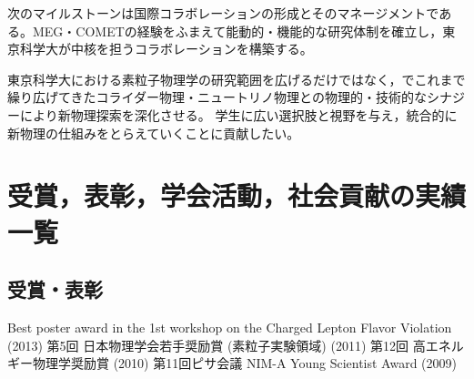 \documentclass[11pt,a4paper,uplatex,dvipdfmx]{ujarticle} 		%
\newcommand{\研究課題名}{象の卵}
\newcommand{\研究機関名}{東京大学}
\newcommand{\研究代表者氏名}{内山雄祐}
\newcommand{\研究期間の最終元号年度}{6}  %
\begin{document}
次のマイルストーンは国際コラボレーションの形成とそのマネージメントである。MEG・COMETの経験をふまえて能動的・機能的な研究体制を確立し，東京科学大が中核を担うコラボレーションを構築する。
%
%
%

\vspace{1zw}
東京科学大における素粒子物理学の研究範囲を広げるだけではなく，でこれまで繰り広げてきたコライダー物理・ニュートリノ物理との物理的・技術的なシナジーにより新物理探索を深化させる。
学生に広い選択肢と視野を与え，統合的に新物理の仕組みをとらえていくことに貢献したい。
\newpage




\section{受賞，表彰，学会活動，社会貢献の実績一覧}
\subsection{受賞・表彰}
\begin{enumerate}
\setcounter{enumi}{66}
	\setlength{\itemsep}{-1pt}
 Best poster award in the 1st workshop on the Charged Lepton Flavor Violation (2013) %
 第5回 日本物理学会若手奨励賞 (素粒子実験領域) (2011)
 第12回 高エネルギー物理学奨励賞 (2010)
 第11回ピサ会議 NIM-A Young Scientist Award (2009) %
\end{enumerate}
\end{document}

